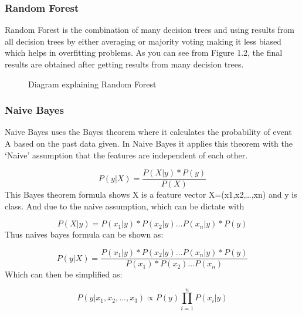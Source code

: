 \documentclass[12pt,oneside,openright,a4paper]{cpe-english-project}
\begin{document}
        \subsubsection{Random Forest}
          \qquad Random Forest is the combination of many decision trees and using results from all decision trees by either averaging or majority voting making it less biased which helps in overfitting problems. As you can see from Figure 1.2, the final results are obtained after getting results from many decision trees.\par
          \begin{figure}[!h]
            \centering
            \caption{Diagram explaining Random Forest}\label{fig:Random_Forest}
          \end{figure}
        \subsubsection{Naive Bayes}
          \qquad Naive Bayes uses the Bayes theorem where it calculates the probability of event A based on the past data given. In Naive Bayes it applies this theorem with the ‘Naive’ assumption that the features are independent of each other.\cite{NaïveBayes1, NaïveBayes2}\par 
          \begin{equation}
            P(y|X) = \frac{P(X|y) * P(y)}{P(X)}
          \end{equation}
          \qquad This Bayes theorem formula shows X is a feature vector  X=(x1,x2,…,xn) and y is class. And due to the naive assumption, which can be dictate with \par
          \begin{equation}
            P(X|y) = P(x_1|y) * P(x_2|y) \ldots P(x_n|y) * P(y)
          \end{equation}
          \qquad Thus naives bayes formula can be shown as: \par
          \begin{equation}
            P(y|X) = \frac{P(x_1|y) * P(x_2|y) \ldots P(x_n|y) * P(y)}{P(x_1) * P(x_2) \ldots P(x_n)}
          \end{equation}
          \qquad Which can then be simplified as: \par
          \begin{equation}
            P(y|x_1,x_2,\ldots,x_3) \propto P(y) \prod\limits_{i=1}^{n} P(x_i|y)
          \end{equation}
\end{document}
